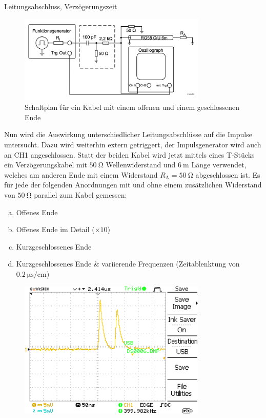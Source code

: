 \documentclass[ngerman]{scrartcl}
\theoremstyle{definition}
\begin{document}
		\begin{aufgabe}{Leitungsabschluss, Verzögerungszeit}
			\aufbau
			\begin{figure}[H]
				\centering
				\includegraphics[width=0.8\textwidth]{figs/Aufbau_1_3_Leitungsabschluss.png}
				\caption{Schaltplan für ein Kabel mit einem offenen und einem geschlossenen Ende~\cite{anleitung}}
				\label{fig:aufbau_1_3_leitungsabschluss}
			\end{figure}
			Nun wird die Auswirkung unterschiedlicher Leitungsabschlüsse auf die Impulse untersucht. Dazu wird weiterhin extern getriggert, der Impulsgenerator wird auch an CH1 angeschlossen. Statt der beiden Kabel wird jetzt mittels eines T-Stücks ein Verzögerungskabel mit $\SI{50}{\ohm}$ Wellenwiderstand und $\SI{6}{\meter}$ Länge verwendet, welches am anderen Ende mit einem Widerstand $R_\mathrm{A} = \SI{50}{\ohm}$ abgeschlossen ist. Es für jede der folgenden Anordnungen mit und ohne einem zusätzlichen Widerstand von $\SI{50}{\ohm}$ parallel zum Kabel gemessen:
			\begin{enumerate}[(a)]
				\item Offenes Ende
				\item Offenes Ende im Detail ($\times 10$)
				\item Kurzgeschlossenes Ende
				\item Kurzgeschlossenes Ende \& variierende Frequenzen (Zeitablenktung von $\SI{0.2}{\micro\second\per\centi\meter}$)
			\end{enumerate}
			\MesswUndAusw
			\begin{unteraufgabe}
				\begin{figure}[H]
					\centering
					\includegraphics[width=0.8\textwidth]{MesswerteVersuch1/DS0006.png}

\end{figure}
\end{unteraufgabe}
\end{aufgabe}
\end{document}
